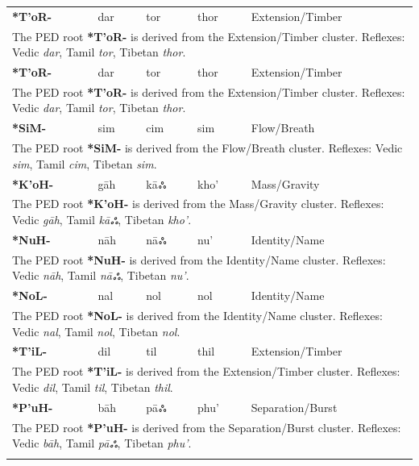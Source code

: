 \begin{longtable}{p{} p{} p{} p{} p{}}
\textbf{*T'oR-} & dar & tor & thor & Extension/Timber \\ 
\multicolumn{5}{p{\textwidth}}{\small The PED root \textbf{*T'oR-} is derived from the Extension/Timber cluster. Reflexes: Vedic \textit{dar}, Tamil \textit{tor}, Tibetan \textit{thor}. } \\ \addlinespace 
\textbf{*T'oR-} & dar & tor & thor & Extension/Timber \\ 
\multicolumn{5}{p{\textwidth}}{\small The PED root \textbf{*T'oR-} is derived from the Extension/Timber cluster. Reflexes: Vedic \textit{dar}, Tamil \textit{tor}, Tibetan \textit{thor}. } \\ \addlinespace 
\textbf{*SiM-} & sim & cim & sim & Flow/Breath \\ 
\multicolumn{5}{p{\textwidth}}{\small The PED root \textbf{*SiM-} is derived from the Flow/Breath cluster. Reflexes: Vedic \textit{sim}, Tamil \textit{cim}, Tibetan \textit{sim}. } \\ \addlinespace 
\textbf{*K'oH-} & gāh & kāஃ & kho' & Mass/Gravity \\ 
\multicolumn{5}{p{\textwidth}}{\small The PED root \textbf{*K'oH-} is derived from the Mass/Gravity cluster. Reflexes: Vedic \textit{gāh}, Tamil \textit{kāஃ}, Tibetan \textit{kho'}. } \\ \addlinespace 
\textbf{*NuH-} & nāh & nāஃ & nu' & Identity/Name \\ 
\multicolumn{5}{p{\textwidth}}{\small The PED root \textbf{*NuH-} is derived from the Identity/Name cluster. Reflexes: Vedic \textit{nāh}, Tamil \textit{nāஃ}, Tibetan \textit{nu'}. } \\ \addlinespace 
\textbf{*NoL-} & nal & nol & nol & Identity/Name \\ 
\multicolumn{5}{p{\textwidth}}{\small The PED root \textbf{*NoL-} is derived from the Identity/Name cluster. Reflexes: Vedic \textit{nal}, Tamil \textit{nol}, Tibetan \textit{nol}. } \\ \addlinespace 
\textbf{*T'iL-} & dil & til & thil & Extension/Timber \\ 
\multicolumn{5}{p{\textwidth}}{\small The PED root \textbf{*T'iL-} is derived from the Extension/Timber cluster. Reflexes: Vedic \textit{dil}, Tamil \textit{til}, Tibetan \textit{thil}. } \\ \addlinespace 
\textbf{*P'uH-} & bāh & pāஃ & phu' & Separation/Burst \\ 
\multicolumn{5}{p{\textwidth}}{\small The PED root \textbf{*P'uH-} is derived from the Separation/Burst cluster. Reflexes: Vedic \textit{bāh}, Tamil \textit{pāஃ}, Tibetan \textit{phu'}. } \\ \addlinespace 

\end{longtable}
